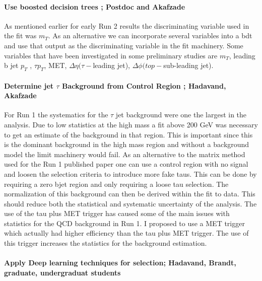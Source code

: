 \paragraph{Use boosted decision trees ;  Postdoc and Akafzade}
As mentioned earlier for early Run 2 results the discriminating variable used in the fit was $m_T$. As an alternative we can incorporate several 
variables into a bdt and use that output as the discriminating variable in the fit machinery.  Some variables that have been investigated in some preliminary studies
are $m_T$, leading b jet $p_T$ , $\tau p_T$, MET, $\Delta \eta(\tau-$leading jet), $\Delta \phi(top-$sub-leading jet).

\paragraph{Determine jet \too $\tau$ Background from Control Region ;  Hadavand, Akafzade}  %
For Run 1 the systematics for the $\tau$ \too jet background were one the largest in the analysis.  Due to low statistics at the high mass a fit above 200 GeV was necessary to get 
an estimate of the background in that region.  This is important since this is the dominant background in the high mass region and without a background model the limit machinery would fail.
As an alternative to the matrix method used for the Run 1 published paper one can use a control region with no signal and loosen the selection criteria to introduce more fake taus.  This can be done
by requiring a zero bjet region and only requiring a loose tau selection.  The normalization of this background can then be derived within the fit to data.  This should reduce both the statistical and systematic uncertainty of the analysis.
The use of the tau plus MET trigger has caused some of the main issues with statistics for the QCD background in Run 1. I proposed to use a MET trigger which actually had higher efficiency than the tau plus MET trigger.  
The use of this trigger increases the statistics for the background estimation.

\paragraph{Apply Deep learning techniques for selection; Hadavand, Brandt, graduate, undergraduat students}

